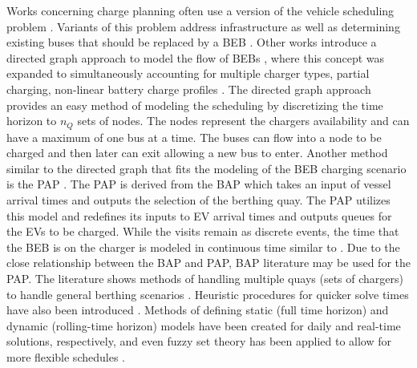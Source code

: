 \documentclass[ee,thesis]{usuthesis}
\begin{document}
Works concerning charge planning often use a version of the vehicle scheduling problem \cite{tang-2019-robus-sched,li-2014-trans-bus,he-2020-optim-charg}. Variants of this problem address infrastructure as well as determining
existing buses that should be replaced by a BEB \cite{zhou-2020-bi-objec,duan-2021-refor-mixed,rinaldi-2020-mixed-fleet,zhou-2020-collab-optim}. Other works introduce a directed graph approach to model the flow
of BEBs \cite{whitaker-2023-a-network,liu-2020-batter-elect}, where this concept was expanded to simultaneously
accounting for multiple charger types, partial charging, non-linear battery charge profiles
\cite{whitaker-2023-a-network}. The directed graph approach provides an easy method of modeling the scheduling by
discretizing the time horizon to \(n_Q\) sets of nodes. The nodes represent the chargers availability and can have a
maximum of one bus at a time. The buses can flow into a node to be charged and then later can exit allowing a new bus to
enter. Another method similar to the directed graph that fits the modeling of the BEB charging scenario is the PAP
\cite{qarebagh-2019-optim-sched}. The PAP is derived from the BAP which takes an input of vessel arrival times and
outputs the selection of the berthing quay. The PAP utilizes this model and redefines its inputs to EV arrival times and
outputs queues for the EVs to be charged. While the visits remain as discrete events, the time that the BEB is on the
charger is modeled in continuous time similar to \cite{frojan-2015-contin-berth,qarebagh-2019-optim-sched,zhou-2020-collab-optim}. Due to the close relationship between the BAP and PAP, BAP
literature may be used for the PAP. The literature shows methods of handling multiple quays (sets of chargers) to handle
general berthing scenarios \cite{frojan-2015-contin-berth,dai-2008-suppl-chain-analy}. Heuristic procedures for
quicker solve times have also been introduced \cite{imai-2001-dynam-berth}. Methods of defining static (full time
horizon) and dynamic (rolling-time horizon) models have been created for daily and real-time solutions, respectively,
and even fuzzy set theory has been applied to allow for more flexible schedules \cite{bello-2019-fuzzy-activ}.
\end{document}
